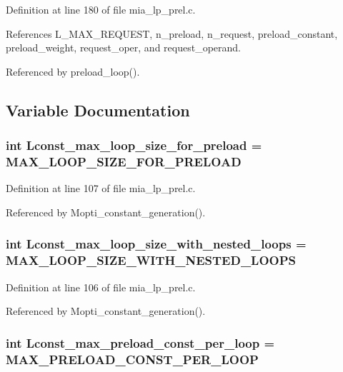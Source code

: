 Definition at line 180 of file mia\_\-lp\_\-prel.c.

References L\_\-MAX\_\-REQUEST, n\_\-preload, n\_\-request, preload\_\-constant, preload\_\-weight, request\_\-oper, and request\_\-operand.

Referenced by preload\_\-loop().

\subsection{Variable Documentation}
\subsubsection{\setlength{\rightskip}{0pt plus 5cm}int \bf{Lconst\_\-max\_\-loop\_\-size\_\-for\_\-preload} = MAX\_\-LOOP\_\-SIZE\_\-FOR\_\-PRELOAD}\label{mia__lp__prel_8c_59948d23605b2eddc8dd0e0888247d92}




Definition at line 107 of file mia\_\-lp\_\-prel.c.

Referenced by Mopti\_\-constant\_\-generation().
\subsubsection{\setlength{\rightskip}{0pt plus 5cm}int \bf{Lconst\_\-max\_\-loop\_\-size\_\-with\_\-nested\_\-loops} = MAX\_\-LOOP\_\-SIZE\_\-WITH\_\-NESTED\_\-LOOPS}\label{mia__lp__prel_8c_59de3285284f791c68c738c8086406d3}




Definition at line 106 of file mia\_\-lp\_\-prel.c.

Referenced by Mopti\_\-constant\_\-generation().
\subsubsection{\setlength{\rightskip}{0pt plus 5cm}int \bf{Lconst\_\-max\_\-preload\_\-const\_\-per\_\-loop} = MAX\_\-PRELOAD\_\-CONST\_\-PER\_\-LOOP}\label{mia__lp__prel_8c_4970b15537e25c34343c0819cd183b73}




